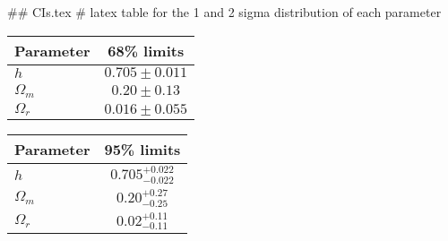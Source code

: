 ## CIs.tex
# latex table for the 1 and 2 sigma distribution of each parameter

\begin{tabular} { l  c}
 Parameter &  68\% limits\\
\hline
{\boldmath$h              $} & $0.705\pm 0.011            $\\
{\boldmath$\Omega_m       $} & $0.20\pm 0.13              $\\
{\boldmath$\Omega_r       $} & $0.016\pm 0.055            $\\
\hline
\end{tabular}

\begin{tabular} { l  c}
 Parameter &  95\% limits\\
\hline
{\boldmath$h              $} & $0.705^{+0.022}_{-0.022}   $\\
{\boldmath$\Omega_m       $} & $0.20^{+0.27}_{-0.25}      $\\
{\boldmath$\Omega_r       $} & $0.02^{+0.11}_{-0.11}      $\\
\hline
\end{tabular}
